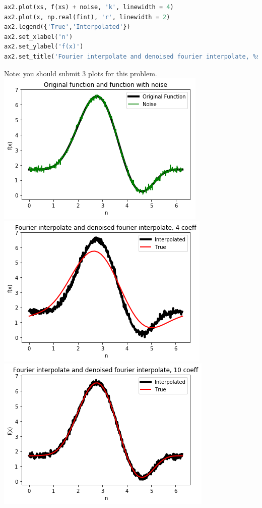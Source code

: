 \documentclass[10pt]{exam}
\begin{document}
\begin{questions}
\begin{lstlisting}[language = Python]
ax2.plot(xs, f(xs) + noise, 'k', linewidth = 4)
ax2.plot(x, np.real(fint), 'r', linewidth = 2)
ax2.legend({'True','Interpolated'})
ax2.set_xlabel('n')
ax2.set_ylabel('f(x)')
ax2.set_title('Fourier interpolate and denoised fourier interpolate, %s coeff' % nSmall)
\end{lstlisting}
Note: you should submit $3$ plots for this problem.
\\
\centering
\includegraphics[scale=0.55]{Good_Stuff.png}
\\
\includegraphics[scale=0.55]{Oh_Baby.png}
\includegraphics[scale=0.55]{A_Triple_Plot.png}


\end{questions}
\end{document}
